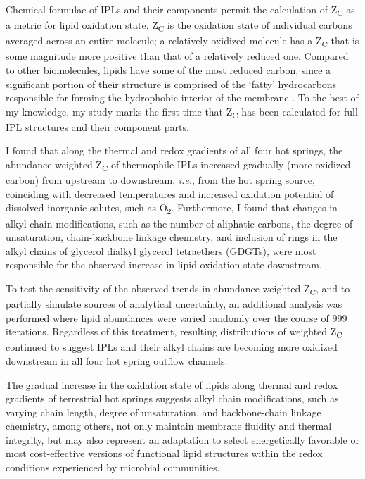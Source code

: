 Chemical formulae of IPLs and their components permit the calculation of Z\textsubscript{C} as a metric for lipid oxidation state. Z\textsubscript{C} is the oxidation state of individual carbons averaged across an entire molecule;  a relatively oxidized molecule has a Z\textsubscript{C} that is some magnitude more positive than that of a relatively reduced one. Compared to other biomolecules, lipids have some of the most reduced carbon, since a significant portion of their structure is comprised of the `fatty' hydrocarbons responsible for forming the hydrophobic interior of the membrane \citep{likens2010biogeochemistry}. To the best of my knowledge, my study marks the first time that Z\textsubscript{C} has been calculated for full IPL structures and their component parts.

I found that along the thermal and redox gradients of all four hot springs, the abundance-weighted Z\textsubscript{C} of thermophile IPLs increased gradually (more oxidized carbon) from upstream to downstream, \textit{i.e.}, from the hot spring source, coinciding with decreased temperatures and increased oxidation potential of dissolved inorganic solutes, such as O\textsubscript{2}. Furthermore, I found that changes in alkyl chain modifications, such as the number of aliphatic carbons, the degree of unsaturation, chain-backbone linkage chemistry, and inclusion of rings in the alkyl chains of glycerol dialkyl glycerol tetraethers (GDGTs), were most responsible for the observed increase in lipid oxidation state downstream.

To test the sensitivity of the observed trends in abundance-weighted Z\textsubscript{C}, and to partially simulate sources of analytical uncertainty, an additional analysis was performed where lipid abundances were varied randomly over the course of 999 iterations. Regardless of this treatment, resulting distributions of weighted Z\textsubscript{C} continued to suggest IPLs and their alkyl chains are becoming more oxidized downstream in all four hot spring outflow channels.

The gradual increase in the oxidation state of lipids along thermal and redox gradients of terrestrial hot springs suggests alkyl chain modifications, such as varying chain length, degree of unsaturation, and backbone-chain linkage chemistry, among others, not only maintain membrane fluidity and thermal integrity, but may also represent an adaptation to select energetically favorable or most cost-effective versions of functional lipid structures within the redox conditions experienced by microbial communities.




